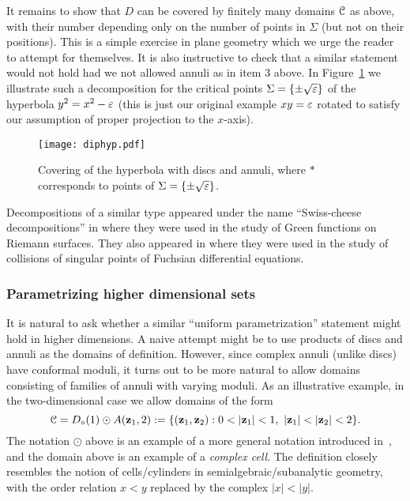 \documentclass[reqno]{amsart}
\renewcommand\~[1]{\widetilde{#1}}
\def\vz{{\mathbf z}}
\begin{document}
It remains to show that $D$ can be covered by finitely many domains
${\mathcal C}$ as above, with their number depending only on the number of
points in $\Sigma$ (but not on their positions). This is a simple
exercise in plane geometry which we urge the reader to attempt for
themselves. It is also instructive to check that a similar statement
would not hold had we not allowed annuli as in item 3 above.  In
Figure~\ref{fig:diphyp} we illustrate such a decomposition for the
critical points $\Sigma=\{\pm\sqrt{\varepsilon}\}$ of the hyperbola $y^2=x^2-\varepsilon$
(this is just our original example $xy=\varepsilon$ rotated to satisfy our
assumption of proper projection to the $x$-axis).
\begin{figure}
  \centering
  \texttt{[image: diphyp.pdf]}
  \caption{Covering of the hyperbola with discs and annuli, where $*$
    corresponds to points of $\Sigma=\{\pm\sqrt{\varepsilon}\}$.}
  \label{fig:diphyp}
\end{figure}

Decompositions of a similar type appeared under the name
``Swiss-cheese decompositions'' in \cite{hs:variations} where they
were used in the study of Green functions on Riemann surfaces. They
also appeared in \cite{me:inf16} where they were used in the study of
collisions of singular points of Fuchsian differential equations.

\subsubsection{Parametrizing higher dimensional sets}

It is natural to ask whether a similar ``uniform parametrization''
statement might hold in higher dimensions. A naive attempt might be to
use products of discs and annuli as the domains of
definition. However, since complex annuli (unlike discs) have
conformal moduli, it turns out to be more natural to allow domains
consisting of families of annuli with varying moduli. As an
illustrative example, in the two-dimensional case we allow domains of
the form
\begin{equation}
  \cC=D_\circ(1)\odot A(\vz_1,2) := \{(\vz_1,\vz_2) : 0<|\vz_1|<1,\ |\vz_1|<|\vz_2|<2\}.
\end{equation}
The notation $\odot$ above is an example of a more general notation
introduced in~, and the domain above is an
example of a \emph{complex cell}. The definition closely resembles the
notion of cells/cylinders in semialgebraic/subanalytic geometry, with
the order relation $x<y$ replaced by the complex $|x|<|y|$.
\end{document}
